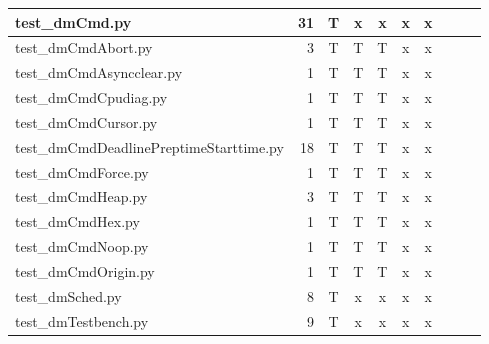 \documentclass[12pt,a4paper]{report}
\begin{document}
\begin{table}
\begin{tabular}[t]{|l|r|c|c|c|c|c|c|c|c|}
test\_dmCmd.py                          &  31                 &   T        &   x             &   x           &   x              &   x                 \\ \hline
test\_dmCmdAbort.py                     &  3                  &   T        &   T             &   T           &   x              &   x                 \\ \hline
test\_dmCmdAsyncclear.py                &  1                  &   T        &   T             &   T           &   x              &   x                 \\ \hline
test\_dmCmdCpudiag.py                   &  1                  &   T        &   T             &   T           &   x              &   x                 \\ \hline
test\_dmCmdCursor.py                    &  1                  &   T        &   T             &   T           &   x              &   x                 \\ \hline
test\_dmCmdDeadlinePreptimeStarttime.py &  18                 &   T        &   T             &   T           &   x              &   x                 \\ \hline
test\_dmCmdForce.py                     &  1                  &   T        &   T             &   T           &   x              &   x                 \\ \hline
test\_dmCmdHeap.py                      &  3                  &   T        &   T             &   T           &   x              &   x                 \\ \hline
test\_dmCmdHex.py                       &  1                  &   T        &   T             &   T           &   x              &   x                 \\ \hline
test\_dmCmdNoop.py                      &  1                  &   T        &   T             &   T           &   x              &   x                 \\ \hline
test\_dmCmdOrigin.py                    &  1                  &   T        &   T             &   T           &   x              &   x                 \\ \hline
test\_dmSched.py                        &  8                  &   T        &   x             &   x           &   x              &   x                 \\ \hline
test\_dmTestbench.py                    &  9                  &   T        &   x             &   x           &   x              &   x                 \\ \hline

\end{tabular}
\end{table}
\end{document}
